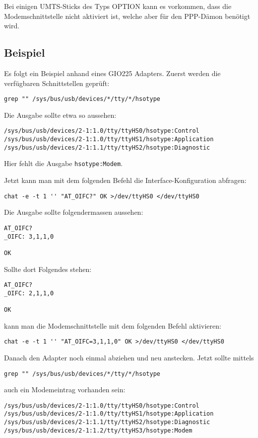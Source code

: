 Bei einigen UMTS-Sticks des Typs OPTION kann es vorkommen, dass die
Modemschnittstelle nicht aktiviert ist, welche aber für den PPP-Dämon benötigt
wird.

\subsection{Beispiel}

Es folgt ein Beispiel anhand eines GIO225 Adapters. Zuerst werden die
verfügbaren Schnittstellen geprüft:
\begin{verbatim}
grep "" /sys/bus/usb/devices/*/tty/*/hsotype
\end{verbatim}

Die Ausgabe sollte etwa so aussehen:
\begin{verbatim}
/sys/bus/usb/devices/2-1:1.0/tty/ttyHS0/hsotype:Control
/sys/bus/usb/devices/2-1:1.0/tty/ttyHS1/hsotype:Application
/sys/bus/usb/devices/2-1:1.1/tty/ttyHS2/hsotype:Diagnostic
\end{verbatim}

Hier fehlt die Ausgabe \verb+hsotype:Modem+.

Jetzt kann man mit dem folgenden Befehl die Interface-Konfiguration
abfragen:
\begin{verbatim}
chat -e -t 1 '' "AT_OIFC?" OK >/dev/ttyHS0 </dev/ttyHS0
\end{verbatim}

Die Ausgabe sollte folgendermassen aussehen:
\begin{verbatim}
AT_OIFC?
_OIFC: 3,1,1,0

OK
\end{verbatim}

Sollte dort Folgendes stehen:
\begin{verbatim}
AT_OIFC?
_OIFC: 2,1,1,0

OK
\end{verbatim}

kann man die Modemschnittstelle mit dem folgenden Befehl aktivieren:
\begin{verbatim}
chat -e -t 1 '' "AT_OIFC=3,1,1,0" OK >/dev/ttyHS0 </dev/ttyHS0
\end{verbatim}

Danach den Adapter noch einmal abziehen und neu anstecken.
Jetzt sollte mittels
\begin{verbatim}
grep "" /sys/bus/usb/devices/*/tty/*/hsotype
\end{verbatim}

auch ein Modemeintrag vorhanden sein:
\begin{verbatim}
/sys/bus/usb/devices/2-1:1.0/tty/ttyHS0/hsotype:Control
/sys/bus/usb/devices/2-1:1.0/tty/ttyHS1/hsotype:Application
/sys/bus/usb/devices/2-1:1.1/tty/ttyHS2/hsotype:Diagnostic
/sys/bus/usb/devices/2-1:1.2/tty/ttyHS3/hsotype:Modem
\end{verbatim}
